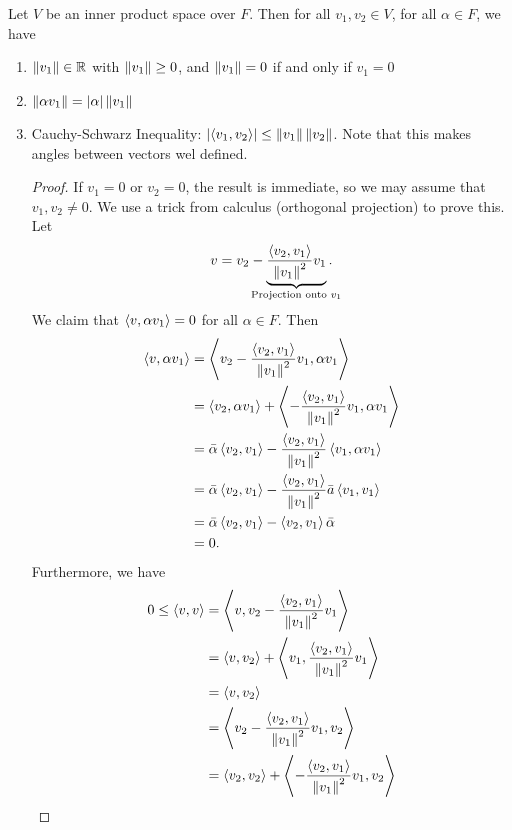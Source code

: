\documentclass[class=article, crop=false]{standalone}
\begin{document}
  \begin{theorem}{}
    Let $V$ be an inner product space over $F$. Then for all $v_1,v_2\in V$, for all $\alpha\in F$, we have
    \begin{enumerate}[label=(\alph*)]
      \item $\left\lVert v_1\right\rVert\in \mathbb{R}$ with $\left\lVert v_1\right\rVert\geq 0$, and $\left\lVert v_1\right\rVert = 0$ if and only if $v_1 = 0$
      \item $\left\lVert \alpha v_1\right\rVert = \left\lvert \alpha \right\rvert\left\lVert v_1\right\rVert$
      \item Cauchy-Schwarz Inequality: $\left\lvert \left\langle v_1,v_2 \right\rangle \right\rvert \leq \left\lVert v_1\right\rVert\left\lVert v_2\right\rVert$. Note that this makes angles between vectors wel defined.
      \begin{proof}
        If $v_1 = 0$ or $v_2 = 0$, the result is immediate, so we may assume that $v_1, v_2\neq 0$. We use a trick from calculus (orthogonal projection) to prove this. Let 
        \[
          v = v_2 - \underbrace{\frac{\tup{v_2,v_1}}{\norm{v_1}^2}v_1}_{\mathclap{\text{Projection onto }v_1}}.
        \]
        We claim that $\left\langle v, \alpha v_1 \right\rangle = 0$ for all $\alpha\in F$. Then 
        \begin{align*}
          \left\langle v, \alpha v_1 \right\rangle &= \left\langle v_2 - \frac{\left\langle v_2, v_1 \right\rangle}{\left\lVert v_1\right\rVert^2}v_1, \alpha v_1 \right\rangle \\
                              &= \left\langle v_2, \alpha v_1 \right\rangle + \left\langle -\frac{\left\langle v_2,v_1 \right\rangle}{\left\lVert v_1\right\rVert^2}v_1, \alpha v_1 \right\rangle \\
                              &= \bar{\alpha}\left\langle v_2, v_1 \right\rangle -\frac{\left\langle v_2,v_1 \right\rangle}{\left\lVert v_1\right\rVert^2}\left\langle v_1, \alpha v_1 \right\rangle \\
                              &= \bar{\alpha}\left\langle v_2,v_1 \right\rangle - \frac{\left\langle v_2,v_1 \right\rangle}{\left\lVert v_1\right\rVert^2}\bar{a}\left\langle v_1,v_1 \right\rangle \\
                              &= \bar{\alpha}\left\langle v_2,v_1 \right\rangle - \left\langle v_2,v_1 \right\rangle\bar{\alpha} \\
                              &= 0.
        \end{align*}
        Furthermore, we have
        \begin{align*}
          0\leq \tup{v,v} &= \tup{v, v_2 - \frac{\tup{v_2, v_1}}{\norm{v_1}^2}v_1} \\
                          &= \tup{v, v_2} + \tup{v_1, \frac{\tup{v_2, v_1}}{\norm{v_1}^2}v_1} \\
                          &= \tup{v, v_2} \\
                          &= \tup{v_2 - \frac{\tup{v_2, v_1}}{\norm{v_1}^2}v_1, v_2} \\
                          &= \tup{v_2,v_2} + \tup{-\frac{\tup{v_2, v_1}}{\norm{v_1}^2}v_1, v_2} \\

\end{align*}
\end{proof}
\end{enumerate}
\end{theorem}
\end{document}
